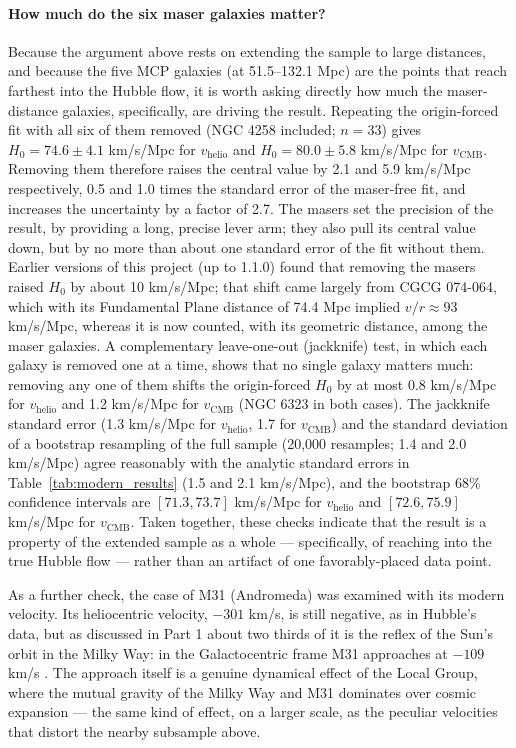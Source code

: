 \documentclass[11pt]{article}
\begin{document}
\paragraph{How much do the six maser galaxies matter?}
\label{sec:sensitivity}
Because the argument above rests on extending the sample to large distances, and because the five MCP galaxies (at 51.5--132.1 Mpc) are the points that reach farthest into the Hubble flow, it is worth asking directly how much the maser-distance galaxies, specifically, are driving the result. Repeating the origin-forced fit with all six of them removed (NGC 4258 included; $n=33$) gives $H_0 = 74.6 \pm 4.1$ km/s/Mpc for $v_{\text{helio}}$ and $H_0 = 80.0 \pm 5.8$ km/s/Mpc for $v_{\text{CMB}}$. Removing them therefore raises the central value by 2.1 and 5.9 km/s/Mpc respectively, 0.5 and 1.0 times the standard error of the maser-free fit, and increases the uncertainty by a factor of 2.7. The masers set the precision of the result, by providing a long, precise lever arm; they also pull its central value down, but by no more than about one standard error of the fit without them. Earlier versions of this project (up to 1.1.0) found that removing the masers raised $H_0$ by about 10 km/s/Mpc; that shift came largely from CGCG 074-064, which with its Fundamental Plane distance of 74.4 Mpc implied $v/r \approx 93$ km/s/Mpc, whereas it is now counted, with its geometric distance, among the maser galaxies. A complementary leave-one-out (jackknife) test, in which each galaxy is removed one at a time, shows that no single galaxy matters much: removing any one of them shifts the origin-forced $H_0$ by at most 0.8 km/s/Mpc for $v_{\text{helio}}$ and 1.2 km/s/Mpc for $v_{\text{CMB}}$ (NGC 6323 in both cases). The jackknife standard error (1.3 km/s/Mpc for $v_{\text{helio}}$, 1.7 for $v_{\text{CMB}}$) and the standard deviation of a bootstrap resampling of the full sample (20{,}000 resamples; 1.4 and 2.0 km/s/Mpc) agree reasonably with the analytic standard errors in Table~\ref{tab:modern_results} (1.5 and 2.1 km/s/Mpc), and the bootstrap 68\% confidence intervals are $[71.3, 73.7]$ km/s/Mpc for $v_{\text{helio}}$ and $[72.6, 75.9]$ km/s/Mpc for $v_{\text{CMB}}$. Taken together, these checks indicate that the result is a property of the extended sample as a whole --- specifically, of reaching into the true Hubble flow --- rather than an artifact of one favorably-placed data point.

As a further check, the case of M31 (Andromeda) was examined with its modern velocity. Its heliocentric velocity, $-301$ km/s, is still negative, as in Hubble's data, but as discussed in Part 1 about two thirds of it is the reflex of the Sun's orbit in the Milky Way: in the Galactocentric frame M31 approaches at $-109$ km/s \citep{vandermarel2012}. The approach itself is a genuine dynamical effect of the Local Group, where the mutual gravity of the Milky Way and M31 dominates over cosmic expansion --- the same kind of effect, on a larger scale, as the peculiar velocities that distort the nearby subsample above.
\end{document}
